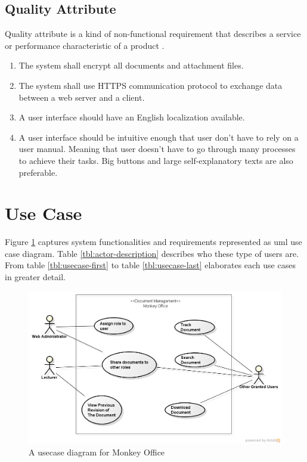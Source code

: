 \subsection{Quality Attribute}
Quality attribute is a kind of non-functional requirement that describes a service or performance characteristic of a product \cite{wiegers_2003}.
\begin{enumerate}
	\item The system shall encrypt all documents and attachment files.
	\item The system shall use HTTPS communication protocol to exchange data between a web server and a client.
	\item A user interface should have an English localization available.
	\item A user interface should be intuitive enough that user don't have to rely on a user manual.
	Meaning that user doesn't have to go through many processes to achieve their tasks.
	Big buttons and large self-explanatory texts are also preferable.
\end{enumerate}

\clearpage

\section{Use Case}
\label{section:usecase}
Figure \ref{fig:usecase-diagram} captures system functionalities and requirements represented as \gls{uml} use case diagram.
Table \ref{tbl:actor-description} describes who these type of users are.
From table \ref{tbl:usecase-first} to table \ref{tbl:usecase-last} elaborates each use cases in greater detail.

\begin{figure}
	\centering
	\includegraphics[scale=0.6]{res/software-design/usecase_diagram}
	\caption{A usecase diagram for Monkey Office}
	\label{fig:usecase-diagram}
\end{figure}

